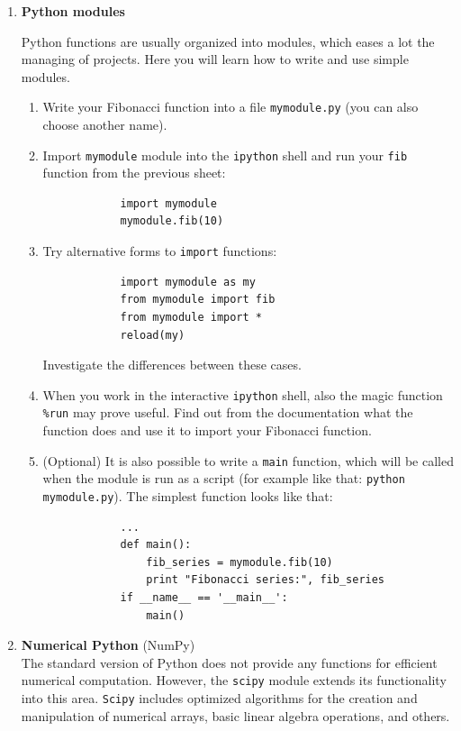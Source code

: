 \documentclass[12pt, a4]{article}
\begin{document}
\begin{enumerate}

    \item \textbf{Python modules}

    Python functions are usually organized into modules, which eases a lot the managing of projects. Here you will learn how to write and use simple modules.
    \begin{enumerate}
        \item Write your Fibonacci function into a file \texttt{mymodule.py} (you can also choose another name).
        \item Import \texttt{mymodule} module into the \texttt{ipython} shell and run your \texttt{fib} function from the previous sheet:
        \begin{verbatim}
            import mymodule
            mymodule.fib(10)
        \end{verbatim} 
        \item Try alternative forms to \texttt{import} functions:
        \begin{verbatim}
            import mymodule as my
            from mymodule import fib
            from mymodule import *
            reload(my)
        \end{verbatim}
        Investigate the differences between these cases.
        \item When you work in the interactive \texttt{ipython} shell, also the magic function \texttt{\%run} may prove useful. Find out from the documentation what the function does and use it to import your Fibonacci function.
        \item (Optional) It is also possible to write a \texttt{main} function, which will be called when the module is run as a script (for example like that: \texttt{python mymodule.py}). The simplest function looks like that:
        \begin{verbatim}
            ...
            def main():
                fib_series = mymodule.fib(10)
                print "Fibonacci series:", fib_series
            if __name__ == '__main__':
                main()
        \end{verbatim}
    \end{enumerate}

    \item \textbf{Numerical Python} (NumPy) \\
    The standard version of Python does not provide any functions for efficient numerical computation. However, the \texttt{scipy} module extends its functionality into this area. \texttt{Scipy} includes optimized algorithms for the creation and manipulation of numerical arrays, basic linear algebra operations, and others.
    

\end{enumerate}
\end{document}
